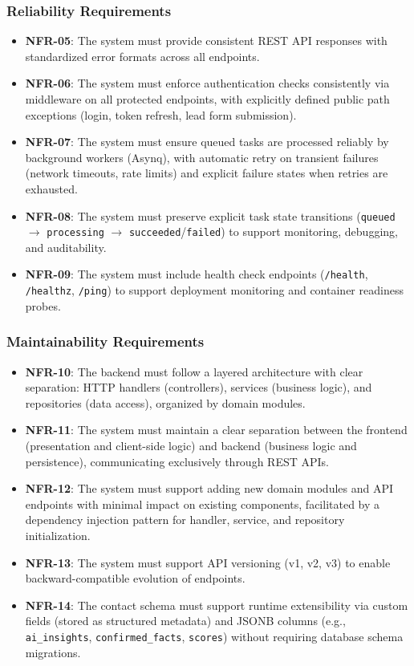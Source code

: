 \subsubsection{Reliability Requirements}
\begin{itemize}
    \item \textbf{NFR-05}: The system must provide consistent REST API responses with standardized error formats across all endpoints.
    \item \textbf{NFR-06}: The system must enforce authentication checks consistently via middleware on all protected endpoints, with explicitly defined public path exceptions (login, token refresh, lead form submission).
    \item \textbf{NFR-07}: The system must ensure queued tasks are processed reliably by background workers (Asynq), with automatic retry on transient failures (network timeouts, rate limits) and explicit failure states when retries are exhausted.
    \item \textbf{NFR-08}: The system must preserve explicit task state transitions (\texttt{queued} $\rightarrow$ \texttt{processing} $\rightarrow$ \texttt{succeeded}/\texttt{failed}) to support monitoring, debugging, and auditability.
    \item \textbf{NFR-09}: The system must include health check endpoints (\texttt{/health}, \texttt{/healthz}, \texttt{/ping}) to support deployment monitoring and container readiness probes.
\end{itemize}

\subsubsection{Maintainability Requirements}
\begin{itemize}
    \item \textbf{NFR-10}: The backend must follow a layered architecture with clear separation: HTTP handlers (controllers), services (business logic), and repositories (data access), organized by domain modules.
    \item \textbf{NFR-11}: The system must maintain a clear separation between the frontend (presentation and client-side logic) and backend (business logic and persistence), communicating exclusively through REST APIs.
    \item \textbf{NFR-12}: The system must support adding new domain modules and API endpoints with minimal impact on existing components, facilitated by a dependency injection pattern for handler, service, and repository initialization.
    \item \textbf{NFR-13}: The system must support API versioning (v1, v2, v3) to enable backward-compatible evolution of endpoints.
    \item \textbf{NFR-14}: The contact schema must support runtime extensibility via custom fields (stored as structured metadata) and JSONB columns (e.g., \texttt{ai\_insights}, \texttt{confirmed\_facts}, \texttt{scores}) without requiring database schema migrations.
\end{itemize}


